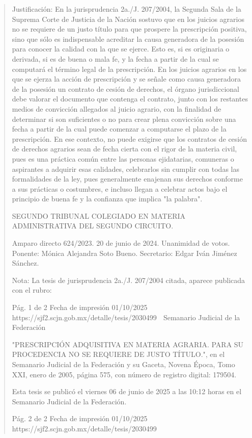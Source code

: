 \documentclass[11pt,a4paper]{article}
\begin{document}
\begin{quote}
Justificación: En la jurisprudencia 2a./J. 207/2004, la Segunda Sala de la Suprema Corte de Justicia
de la Nación sostuvo que en los juicios agrarios no se requiere de un justo título para que prospere
la prescripción positiva, sino que sólo es indispensable acreditar la causa generadora de la posesión
para conocer la calidad con la que se ejerce. Esto es, si es originaria o derivada, si es de buena o
mala fe, y la fecha a partir de la cual se computará el término legal de la prescripción. En los juicios
agrarios en los que se ejerza la acción de prescripción y se señale como causa generadora de la
posesión un contrato de cesión de derechos, el órgano jurisdiccional debe valorar el documento que
contenga el contrato, junto con los restantes medios de convicción allegados al juicio agrario, con la
finalidad de determinar si son suficientes o no para crear plena convicción sobre una fecha a partir
de la cual puede comenzar a computarse el plazo de la prescripción. En ese contexto, no puede
exigirse que los contratos de cesión de derechos agrarios sean de fecha cierta con el rigor de la
materia civil, pues es una práctica común entre las personas ejidatarias, comuneras o aspirantes a
adquirir esas calidades, celebrarlos sin cumplir con todas las formalidades de la ley, pues
generalmente enajenan sus derechos conforme a sus prácticas o costumbres, e incluso llegan a
celebrar actos bajo el principio de buena fe y la confianza que implica "la palabra".

SEGUNDO TRIBUNAL COLEGIADO EN MATERIA ADMINISTRATIVA DEL SEGUNDO CIRCUITO.


Amparo directo 624/2023. 20 de junio de 2024. Unanimidad de votos. Ponente: Mónica Alejandra
Soto Bueno. Secretario: Edgar Iván Jiménez Sánchez.

Nota: La tesis de jurisprudencia 2a./J. 207/2004 citada, aparece publicada con el rubro:

                                              Pág. 1 de 2              Fecha de impresión 01/10/2025
  https://sjf2.scjn.gob.mx/detalle/tesis/2030499
                                                   Semanario Judicial de la Federación

"PRESCRIPCIÓN ADQUISITIVA EN MATERIA AGRARIA. PARA SU PROCEDENCIA NO SE
REQUIERE DE JUSTO TÍTULO.", en el Semanario Judicial de la Federación y su Gaceta, Novena
Época, Tomo XXI, enero de 2005, página 575, con número de registro digital: 179504.


Esta tesis se publicó el viernes 06 de junio de 2025 a las 10:12 horas en el Semanario Judicial de la
Federación.




                                              Pág. 2 de 2            Fecha de impresión 01/10/2025
  https://sjf2.scjn.gob.mx/detalle/tesis/2030499

\end{quote}
\end{document}
